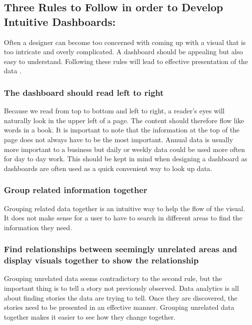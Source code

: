 \documentclass[]{book}
\theoremstyle{definition}
\theoremstyle{definition}
\theoremstyle{definition}
\theoremstyle{remark}
\begin{document}
\subsection{Three Rules to Follow in order to Develop Intuitive
Dashboards:}\label{three-rules-to-follow-in-order-to-develop-intuitive-dashboards-1}

Often a designer can become too concerned with coming up with a visual
that is too intricate and overly complicated. A dashboard should be
appealing but also easy to understand. Following these rules will lead
to effective presentation of the data \citep{intuitive-dash}.

\subsubsection{The dashboard should read left to
right}\label{the-dashboard-should-read-left-to-right-1}

Because we read from top to bottom and left to right, a reader's eyes
will naturally look in the upper left of a page. The content should
therefore flow like words in a book. It is important to note that the
information at the top of the page does not always have to be the most
important. Annual data is usually more important to a business but daily
or weekly data could be used more often for day to day work. This should
be kept in mind when designing a dashboard as dashboards are often used
as a quick convenient way to look up data.

\subsubsection{Group related information
together}\label{group-related-information-together-1}

Grouping related data together is an intuitive way to help the flow of
the visual. It does not make sense for a user to have to search in
different areas to find the information they need.

\subsubsection{Find relationships between seemingly unrelated areas and
display visuals together to show the
relationship}\label{find-relationships-between-seemingly-unrelated-areas-and-display-visuals-together-to-show-the-relationship}

Grouping unrelated data seems contradictory to the second rule, but the
important thing is to tell a story not previously observed. Data
analytics is all about finding stories the data are trying to tell. Once
they are discovered, the stories need to be presented in an effective
manner. Grouping unrelated data together makes it easier to see how they
change together.
\end{document}
